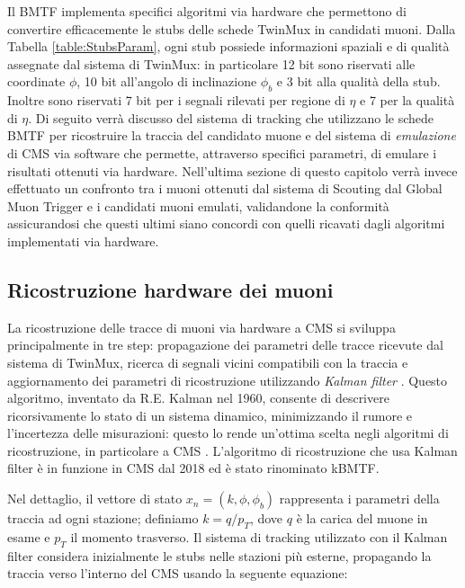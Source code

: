 Il BMTF implementa specifici algoritmi via hardware che permettono di convertire efficacemente le stubs delle schede TwinMux in candidati muoni. Dalla Tabella \ref{table:StubsParam}, ogni stub possiede informazioni spaziali e di qualità assegnate dal sistema di TwinMux: in particolare 12 bit sono riservati alle coordinate $\phi$, 10 bit all'angolo di inclinazione $\phi_b$ e 3 bit alla qualità della stub. Inoltre sono riservati 7 bit per i segnali rilevati per regione di $\eta$ e 7 per la qualità di $\eta$. Di seguito verrà discusso del sistema di tracking che utilizzano le schede BMTF per ricostruire la traccia del candidato muone e del sistema di \textit{emulazione} di CMS via software che permette, attraverso specifici parametri, di emulare i risultati ottenuti via hardware. \newline
Nell'ultima sezione di questo capitolo verrà invece effettuato un confronto tra i muoni ottenuti dal sistema di Scouting dal Global Muon Trigger e i candidati muoni emulati, validandone la conformità assicurandosi che questi ultimi siano concordi con quelli ricavati dagli algoritmi implementati via hardware.


\subsection{Ricostruzione hardware dei muoni}
\label{sec:KalmannFilter}

La ricostruzione delle tracce di muoni via hardware a CMS si sviluppa principalmente in tre step: propagazione dei parametri delle tracce ricevute dal sistema di TwinMux, ricerca di segnali vicini compatibili con la traccia e aggiornamento dei parametri di ricostruzione utilizzando \textit{Kalman filter} \cite{Summers:2728522}. \newline
Questo algoritmo, inventato da R.E. Kalman nel 1960, consente di descrivere ricorsivamente lo stato di un sistema dinamico, minimizzando il rumore e l'incertezza delle misurazioni: questo lo rende un'ottima scelta negli algoritmi di ricostruzione, in particolare a CMS \cite{welch1995introduction}. L'algoritmo di ricostruzione che usa Kalman filter è in funzione in CMS dal 2018 ed è stato rinominato kBMTF. 

Nel dettaglio, il vettore di stato $x_n = (k, \phi, \phi_b)$ rappresenta i parametri della traccia ad ogni stazione; definiamo $k = q/p_T$, dove $q$ è la carica del muone in esame e $p_T$ il momento trasverso. Il sistema di tracking utilizzato con il Kalman filter considera inizialmente le stubs nelle stazioni più esterne, propagando la traccia verso l'interno del CMS usando la seguente equazione:

